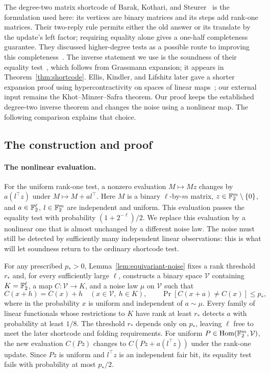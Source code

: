 The degree-two matrix shortcode of Barak, Kothari, and
Steurer~\cite{BKS18} is the formulation used here: its vertices are
binary matrices and its steps add rank-one matrices. Their two-reply rule
permits either the old answer or its translate by the update's left factor;
requiring equality alone gives a one-half completeness guarantee. They
discussed higher-degree tests as a possible route to improving this
completeness~\cite[Section~1.6]{BKS18}. The inverse statement we use is
the soundness of their equality test~\cite[Hypothesis~2.1]{BKS18}, which
follows from Grassmann expansion; it appears in Theorem~\ref{thm:shortcode}.
Ellis, Kindler, and Lifshitz later gave a shorter expansion proof using
hypercontractivity on spaces of linear maps~\cite{EKL26}; our external
input remains the Khot--Minzer--Safra theorem. Our proof keeps the
established degree-two inverse theorem and changes the noise using a
nonlinear map. The following comparison explains that choice.

\subsection{The construction and proof}

\paragraph{The nonlinear evaluation.}
For the uniform rank-one test, a nonzero evaluation \(M\mapsto Mz\)
changes by \(a(l^\top z)\) under \(M\mapsto M+a l^\top\). Here \(M\)
is a binary \(\ell\)-by-\(m\) matrix, \(z\in\mathbb F_2^m\setminus\{0\}\),
and \(a\in\mathbb F_2^\ell\), \(l\in\mathbb F_2^m\) are independent and uniform.
This evaluation passes the equality test with probability \((1+2^{-\ell})/2\).
We replace this evaluation by a nonlinear one that is almost unchanged
by a different noise law. The noise must still be detected by sufficiently
many independent linear observations: this is what will let soundness
return to the ordinary shortcode test.

For any prescribed \(p_*>0\), Lemma~\ref{lem:equivariant-noise} fixes a rank threshold
\(r_*\) and, for every sufficiently large \(\ell\), constructs a binary
space \(\mathcal V\) containing \(K=\mathbb F_2^\ell\), a map
\(C:\mathcal V\to K\), and a noise law \(\mu\) on \(\mathcal V\) such that
\[
 C(x+h)=C(x)+h\quad(x\in\mathcal V,\ h\in K),\qquad
 \Pr[C(x+a)\ne C(x)]\le p_*,
\]
where in the probability \(x\) is uniform and independent of
\(a\sim\mu\). Every family of linear functionals whose restrictions to
\(K\) have rank at least \(r_*\) detects \(a\) with probability at least
\(1/8\). The threshold \(r_*\) depends only on \(p_*\), leaving \(\ell\)
free to meet the later shortcode and folding requirements. For uniform
\(P\in\operatorname{Hom}(\mathbb F_2^m,\mathcal V)\), the new evaluation \(C(Pz)\) changes
to \(C(Pz+a(l^\top z))\) under the rank-one update. Since \(Pz\) is
uniform and \(l^\top z\) is an independent fair bit, its equality test
fails with probability at most \(p_*/2\).

